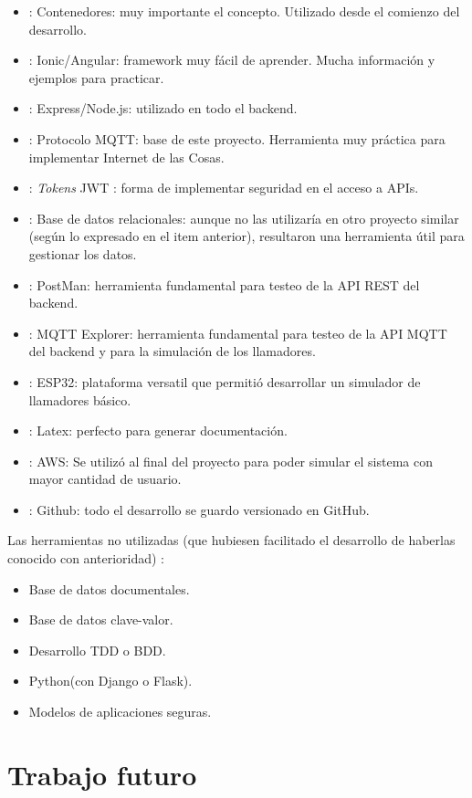 \begin{itemize}
\item: Contenedores: muy importante el concepto. Utilizado desde el comienzo del desarrollo.
\item: Ionic/Angular: framework muy fácil de aprender. Mucha información y ejemplos para practicar.
\item: Express/Node.js: utilizado en todo el backend. 
\item: Protocolo MQTT: base de este proyecto. Herramienta muy práctica para implementar Internet de las Cosas.
\item: \textit{Tokens} JWT : forma de implementar seguridad en el acceso a APIs.
\item: Base de datos relacionales: aunque no las utilizaría en otro proyecto similar (según lo expresado en el item anterior), resultaron una herramienta útil para gestionar los datos.
\item: PostMan: herramienta fundamental para testeo de la API REST del backend.
\item: MQTT Explorer: herramienta fundamental para testeo de la API MQTT del backend y para la simulación de los llamadores.
\item: ESP32: plataforma versatil que permitió desarrollar un simulador de llamadores básico.
\item: Latex: perfecto para generar documentación.
\item: AWS: Se utilizó al final del proyecto para poder simular el sistema con mayor cantidad de usuario.
\item: Github: todo el desarrollo se guardo versionado en GitHub.
\end{itemize}

Las herramientas no utilizadas (que hubiesen facilitado el desarrollo de haberlas conocido con anterioridad) :
\begin{itemize}
\item Base de datos documentales.
\item Base de datos clave-valor.
\item Desarrollo TDD o BDD.
\item Python(con Django o Flask).
\item Modelos de aplicaciones seguras.
\end{itemize}
\section{Trabajo futuro}


